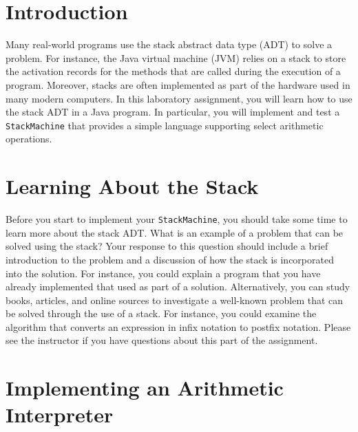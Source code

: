 


\usepackage[compact]{titlesec}


\section*{Introduction}

  Many real-world programs use the stack abstract data type (ADT) to solve a problem.  For instance, the Java virtual
  machine (JVM) relies on a stack to store the activation records for the methods that are called during the execution
  of a program.  Moreover, stacks are often implemented as part of the hardware used in many modern computers. In this
  laboratory assignment, you will learn how to use the stack ADT in a Java program.  In particular, you will implement
  and test a {\tt StackMachine} that provides a simple language supporting select arithmetic operations.

\section*{Learning About the Stack}

  Before you start to implement your {\tt StackMachine}, you should take some time to learn more about the stack ADT.
  What is an example of a problem that can be solved using the stack? Your response to this question should include a
  brief introduction to the problem and a discussion of how the stack is incorporated into the solution. For instance,
  you could explain a program that you have already implemented that used as part of a solution. Alternatively, you can
  study books, articles, and online sources to investigate a well-known problem that can be solved through the use of a
  stack.  For instance, you could examine the algorithm that converts an expression in infix notation to postfix
  notation. Please see the instructor if you have questions about this part of the assignment.

\section*{Implementing an Arithmetic Interpreter}
  
